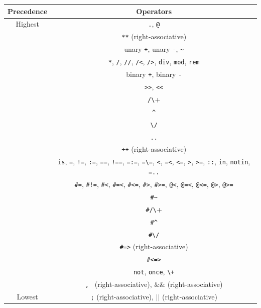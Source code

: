 \begin{center}
\begin{tabular}{ |c|c| } \hline
Precedence & Operators  \\ \hline \hline
Highest    & \verb+.+, \verb+@+ \\ \hline
           & \verb+**+ (right-associative) \\ \hline
           & unary \verb-+-, unary \verb+-+, \verb+~+  \\ \hline 
           & \verb+*+, \verb+/+, \verb+//+, \verb+/<+, \verb+/>+, \verb+div+, \verb+mod+, \verb+rem+ \\ \hline 
           & binary \verb-+-, binary \verb+-+ \\ \hline 
           & \verb+>>+, \verb+<<+ \\ \hline 
           & \verb+/\+ \\ \hline 
           & \verb+^+ \\ \hline 
           & \verb+\/+ \\ \hline 
           & \verb+..+ \\ \hline 
           & \verb-++- (right-associative) \\ \hline 
           & \verb+is+, \verb+=+, \verb+!=+,  \verb+:=+,  \verb+==+, \verb+!==+, \verb+=:=+, \verb+=\=+, \verb+<+,  \verb+=<+, \verb+<=+, \verb+>+,  \verb+>=+, \verb+::+, \verb+in+, \verb+notin+, \verb+=..+  \\ 
           &  \verb+#=+,  \verb+#!=+, \verb+#<+,  \verb+#=<+, \verb+#<=+, \verb+#>+, \verb+#>=+, \verb+@<+, \verb+@=<+, \verb+@<=+, \verb+@>+, \verb+@>=+  \\ \hline 
           & \verb+#~+ \\ \hline 
           & \verb+#/\+ \\ \hline 
           & \verb+#^+ \\ \hline 
           & \verb+#\/+ \\ \hline 
           & \verb+#=>+ (right-associative)\\ \hline 
           & \verb+#<=>+ \\ \hline 
           & \verb+not+, \verb+once+, \verb-\+-  \\ \hline 
           & \verb+, + (right-associative), $\&\&$ (right-associative) \\ \hline 
Lowest     & \verb+;+ (right-associative), $|$$|$ (right-associative) \\ \hline
\end{tabular}
\end{center}

